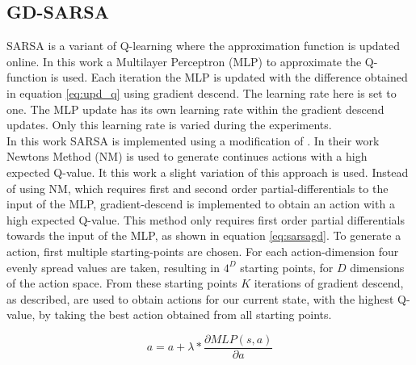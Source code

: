 
\subsection{GD-SARSA}
SARSA is a variant of Q-learning where the approximation function is updated online. In this work a Multilayer Perceptron (MLP) to approximate the Q-function is used. Each iteration the MLP is updated with the difference obtained in equation \eqref{eq:upd_q} using gradient descend. The learning rate here is set to one. The MLP update has its own learning rate within the gradient descend updates. Only this learning rate is varied during the experiments. \\
\newline
In this work SARSA is implemented using a modification of \cite{nichols2015continuous}. In their work Newtons Method (NM) is used to generate continues actions with a high expected Q-value.
It this work a slight variation of this approach is used. Instead of using NM, which requires first and second order partial-differentials to the input of the MLP, gradient-descend is implemented to obtain an action with a high expected Q-value. This method only requires first order partial differentials towards the input of the MLP, as shown in equation \eqref{eq:sarsagd}.
To generate a action, first multiple starting-points are chosen. For each action-dimension four evenly spread values are taken, resulting in $4 ^ D$ starting points, for $D$ dimensions of the action space. From these starting points $K$ iterations of gradient descend, as described, are used to obtain actions for our current state, with the highest Q-value, by taking the best action obtained from all starting points.


\begin{equation}
\label{eq:sarsagd}
a = a + \lambda * \frac{\partial MLP(s,a)}{\partial a}
\end{equation}

